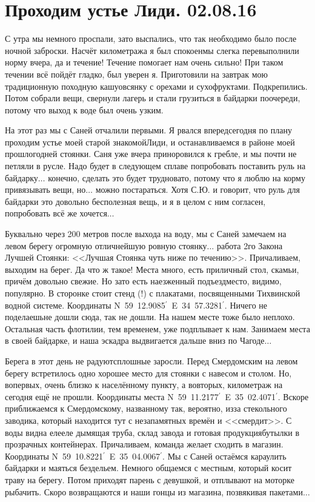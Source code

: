 \chapter{Проходим устье Лиди. 02.08.16} 

С утра мы немного проспали, зато выспались, что так необходимо было после ночной заброски. Насчёт километража я был спокоен\mdash  мы слегка перевыполнили норму вчера, да и течение! Течение помогает нам очень сильно! При таком течении всё пойдёт гладко, был уверен я. Приготовили на завтрак мою традиционную походную кашу\sdash овсянку с орехами и сухофруктами. Подкрепились. Потом собрали вещи, свернули лагерь и стали грузиться в байдарки по\sdash очереди, потому что выход к воде был очень узким. 

На этот раз мы с Саней отчалили первыми. Я рвался вперед\mdash  сегодня по плану проходим устье моей старой знакомой\mdash  Лиди, и останавливаемся в районе моей прошлогодней стоянки. Саня уже вчера приноровился к гребле, и мы почти не петляли в русле. Надо будет в следующем сплаве попробовать поставить руль на байдарку$\ldots$ конечно, сделать это будет трудновато, потому что я люблю на корму привязывать вещи, но$\ldots$ можно постараться. Хотя С.Ю. и говорит, что руль для байдарки это довольно бесполезная вещь, и я в целом с ним согласен, попробовать всё же хочется$\ldots$ 

Буквально через 200 метров после выхода на воду, мы с Саней замечаем на левом берегу огромную отличнейшую ровную стоянку$\ldots$  работа 2\sdash го Закона Лучшей Стоянки: <<Лучшая Стоянка чуть ниже по течению>>. Причаливаем, выходим на берег. Да что ж такое! Места много, есть приличный стол, скамьи, причём довольно свежие. Но зато есть наезженный подъезд\mdash  место, видимо, популярно. В сторонке стоит стенд (!) с плакатами, посвященными Тихвинской водной системе. Координаты N~59\degree~12.9085$^\prime$~E~34\degrees~57.3281$^\prime$. Ничего не поделаешь\mdash  не дошли сюда, так не дошли. На нашем месте тоже было неплохо. Остальная часть флотилии, тем временем, уже подплывает к нам. Занимаем места в своей байдарке, и наша эскадра выдвигается дальше вниз по Чагоде$\ldots$  

Берега в этот день не радуют\mdash  сплошные заросли. Перед Смердомским на левом берегу встретилось одно хорошее место для стоянки с навесом и столом. Но, во\sdash первых, очень близко к населённому пункту, а во\sdash вторых, километраж на сегодня ещё не прошли. Координаты места N~59\degree~11.2177$^\prime$~E~35\degree~02.4071$^\prime$. Вскоре приближаемся к Смердомскому, названному так, вероятно, из\sdash за стекольного заводика, который находится тут с незапамятных времён и <<смердит>>. С воды видна еле\sdash еле дымящая труба, склад завода и готовая продукция\mdash  бутылки в прозрачных контейнерах. Причаливаем, команда желает сходить в магазин. Координаты N~59\degree~10.8221$^\prime$~E~35\degree~04.0067$^\prime$. Мы с Саней остаёмся караулить байдарки и маяться бездельем. Немного общаемся с местным, который косит траву на берегу. Потом приходят парень с девушкой, и отплывают на моторке рыбачить. Скоро возвращаются и наши гонцы из магазина, позвякивая пакетами$\ldots$ 

